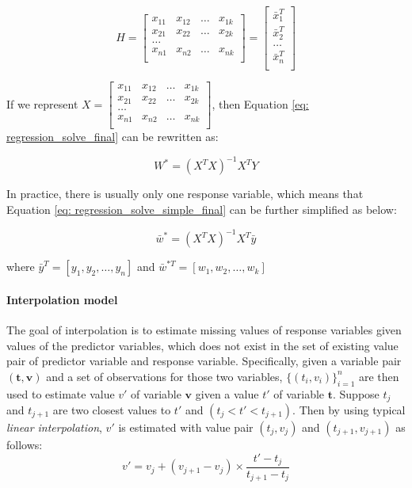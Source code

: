 \begin{equation}
    H=\begin{bmatrix}
x_{11} & x_{12} &\dots &x_{1k}\\
x_{21} & x_{22} &\dots &x_{2k}\\
\dots\\
x_{n1} & x_{n2} &\dots &x_{nk}\\
\end{bmatrix}
=\begin{bmatrix}
\bar{x}_1^T\\
\bar{x}_2^T\\
\dots\\
\bar{x}_n^T\\
\end{bmatrix}
\end{equation}

If we represent $X = \begin{bmatrix}
x_{11} & x_{12} &\dots &x_{1k}\\
x_{21} & x_{22} &\dots &x_{2k}\\
\dots\\
x_{n1} & x_{n2} &\dots &x_{nk}\\
\end{bmatrix}$, then Equation \ref{eq: regression_solve_final} can be rewritten as:

\begin{equation}\label{eq: regression_solve_simple_final}
    W^*=(X^TX)^{-1}X^TY
\end{equation}

In practice, there is usually only one response variable, which means that Equation \ref{eq: regression_solve_simple_final} can be further simplified as below:

\begin{equation}\label{eq: regression_solve_simple_final_simple}
    \bar{w}^*=(X^TX)^{-1}X^T\bar{y}
\end{equation}

where $\bar{y}^T = [y_1,y_2,\dots,y_n]$ and $\bar{w}^{*T} =[w_1,w_2,\dots,w_k]$

\paragraph{Interpolation model} 

The goal of interpolation is to estimate missing values of response variables given values of the predictor variables, which does not exist in the set of existing value pair of predictor variable and response variable. Specifically, given a variable pair $(\textbf{t},\textbf{v})$ and a set of observations for those two variables, $\{(t_i, v_i)\}_{i=1}^n$ are then used to estimate value $v'$ of variable $\textbf{v}$ given a value $t'$ of variable $\textbf{t}$. Suppose $t_j$ and $t_{j+1}$ are two closest values to $t'$ and $(t_j< t' < t_{j+1})$. Then by using typical {\em linear interpolation}, $v'$ is estimated with value pair $(t_j, v_j)$ and $(t_{j+1}, v_{j+1})$ as follows:
\begin{equation}\label{eq: interpolation}
    v'= v_j + (v_{j+1}-v_j)\times\frac{t'-t_j}{t_{j+1}-t_j}
\end{equation}



